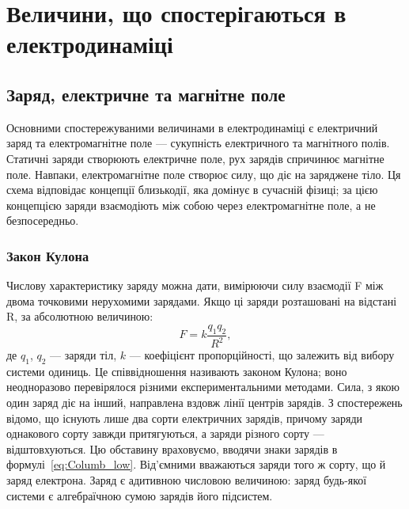
\chapter{Величини, що спостерігаються в електродинаміці}\label{\currfilebase}



\section{Заряд, електричне та магнітне поле}



Основними спостережуваними величинами в електродинаміці є
електричний заряд та електромагнітне поле --- сукупність електричного та
магнітного полів. Статичні заряди створюють електричне поле, рух зарядів
спричинює магнітне поле. Навпаки, електромагнітне поле створює силу, що діє
на заряджене тіло. Ця схема відповідає концепції близькодії, яка домінує в
сучасній фізиці; за цією концепцією заряди взаємодіють між собою через
електромагнітне поле, а не безпосередньо.

\subsection*{Закон Кулона}

Числову характеристику заряду можна дати, вимірюючи
силу взаємодії F між двома точковими нерухомими зарядами. Якщо ці заряди
розташовані на відстані R, за абсолютною величиною:
\begin{equation}\label{eq:Columb_low}
    F = k \frac{q_1q_2}{R^2},
\end{equation}
де $q_1$, $q_2$ --- заряди тіл, $k$ --- коефіцієнт пропорційності, що залежить від вибору
системи одиниць. Це співвідношення називають законом Кулона; воно
неодноразово перевірялося різними експериментальними методами. Сила, з
якою один заряд діє на інший, направлена вздовж лінії центрів зарядів.
З спостережень відомо, що існують лише два сорти електричних зарядів,
причому заряди однакового сорту завжди притягуються, а заряди різного сорту
— відштовхуються. Цю обставину враховуємо, вводячи знаки зарядів в
формулі~\eqref{eq:Columb_low}. Від'ємними вважаються заряди того ж сорту, що й заряд
електрона. Заряд є адитивною числовою величиною: заряд будь-якої
системи є алгебраїчною сумою зарядів його підсистем.

